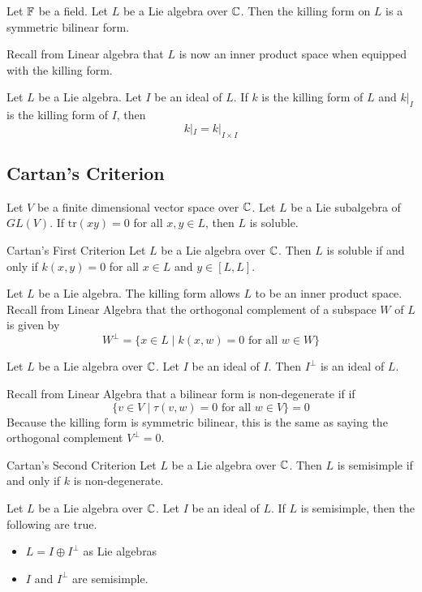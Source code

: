 \documentclass[a4paper]{article}
\begin{document}
\begin{lmm}{}{} Let $\mathbb{F}$ be a field. Let $L$ be a Lie algebra over $\mathbb{C}$. Then the killing form on $L$ is a symmetric bilinear form. 
\end{lmm}

Recall from Linear algebra that $L$ is now an inner product space when equipped with the killing form. 

\begin{lmm}{}{} Let $L$ be a Lie algebra. Let $I$ be an ideal of $L$. If $k$ is the killing form of $L$ and $k|_I$ is the killing form of $I$, then $$k|_I=k|_{I\times I}$$
\end{lmm}

\subsection{Cartan's Criterion}
\begin{prp}{}{} Let $V$ be a finite dimensional vector space over $\mathbb{C}$. Let $L$ be a Lie subalgebra of $GL(V)$. If $\text{tr}(xy)=0$ for all $x,y\in L$, then $L$ is soluble. 
\end{prp}

\begin{thm}{Cartan's First Criterion}{} Let $L$ be a Lie algebra over $\mathbb{C}$. Then $L$ is soluble if and only if $k(x,y)=0$ for all $x\in L$ and $y\in[L,L]$. 
\end{thm}

Let $L$ be a Lie algebra. The killing form allows $L$ to be an inner product space. Recall from Linear Algebra that the orthogonal complement of a subspace $W$ of $L$ is given by $$W^\perp=\{x\in L\;|\;k(x,w)=0\text{ for all }w\in W\}$$

\begin{lmm}{}{} Let $L$ be a Lie algebra over $\mathbb{C}$. Let $I$ be an ideal of $I$. Then $I^\perp$ is an ideal of $L$. 
\end{lmm}

Recall from Linear Algebra that a bilinear form is non-degenerate if  if $$\{v\in V\;|\;\tau(v,w)=0\text{ for all }w\in V\}=0$$ Because the killing form is symmetric bilinear, this is the same as saying the orthogonal complement $V^\perp=0$. 

\begin{thm}{Cartan's Second Criterion}{} Let $L$ be a Lie algebra over $\mathbb{C}$. Then $L$ is semisimple if and only if $k$ is non-degenerate. 
\end{thm}

\begin{lmm}{}{} Let $L$ be a Lie algebra over $\mathbb{C}$. Let $I$ be an ideal of $L$. If $L$ is semisimple, then the following are true. 
\begin{itemize}
\item $L=I\oplus I^\perp$ as Lie algebras
\item $I$ and $I^\perp$ are semisimple. 
\end{itemize}
\end{lmm}
\end{document}

